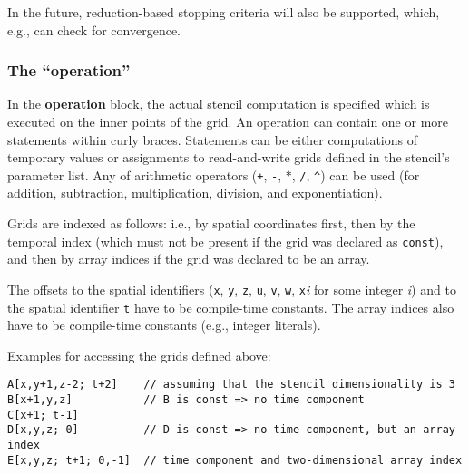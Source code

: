 In the future, reduction-based stopping criteria will also be supported, which, e.g., can check for convergence.


\subsubsection{The ``operation''}

In the \textbf{operation} block, the actual stencil computation is specified which is executed on the inner
points of the grid. An operation can contain one or more statements within curly braces.
Statements can be either computations of temporary values or assignments to read-and-write grids
defined in the stencil's parameter list.
Any of arithmetic operators (\texttt{+}, \texttt{-}, $\ast$, \texttt{/}, \texttt{\textasciicircum}) can be used
(for addition, subtraction, multiplication, division, and exponentiation).

Grids are indexed as follows:
\noindent i.e., by spatial coordinates first, then by the temporal index (which must not be present if the grid
was declared as \texttt{const}), and then by array indices if the grid was declared to be an array.

The offsets to the spatial identifiers (\texttt{x}, \texttt{y}, \texttt{z}, \texttt{u}, \texttt{v}, \texttt{w},
\texttt{x}\textit{i} for some integer \textit{i}) and to the spatial identifier \texttt{t} have to be compile-time constants.
The array indices also have to be compile-time constants (e.g., integer literals).

\medskip
\noindent Examples for accessing the grids defined above:
\begin{lstlisting}[language=stencil]
A[x,y+1,z-2; t+2]    // assuming that the stencil dimensionality is 3
B[x+1,y,z]           // B is const => no time component
C[x+1; t-1]
D[x,y,z; 0]          // D is const => no time component, but an array index
E[x,y,z; t+1; 0,-1]  // time component and two-dimensional array index
\end{lstlisting}

